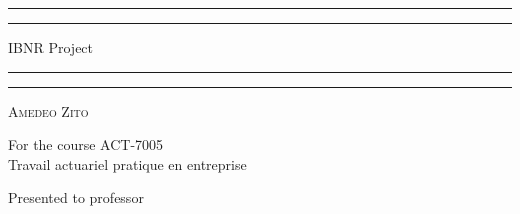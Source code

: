 	\begin{titlepage}
		\centering %
		
		\scshape %
		
		\vspace*{3\baselineskip} %
		
		
		\rule{\textwidth}{1.6pt}\vspace*{-\baselineskip}\vspace*{2pt} %
		\rule{\textwidth}{0.4pt} %
		
		\vspace{0.75\baselineskip} %
		
		{\LARGE IBNR Project\\} %
		\vspace{0.75\baselineskip} %
		
		\rule{\textwidth}{0.4pt}\vspace*{-\baselineskip}\vspace{3.2pt} %
		\rule{\textwidth}{1.6pt} %
		
		\vspace{2\baselineskip} %
		
		{\scshape\Large Amedeo Zito\\} %
		
		\vspace*{3\baselineskip}
		
		For the course ACT-7005\\
		Travail actuariel pratique en entreprise \\%
		
		\vspace*{3\baselineskip} %
		
		
		Presented to professor
		
		\vspace{0.5\baselineskip} %
		

\end{titlepage}
